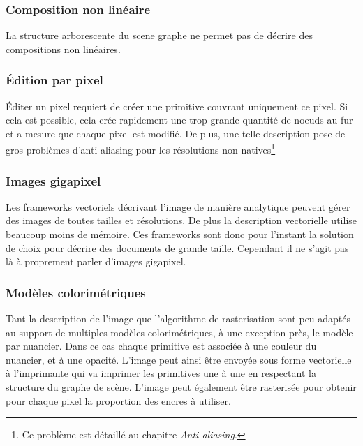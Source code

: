 			\subsubsection{Composition non linéaire}
				La structure arborescente du scene graphe ne permet pas de décrire des compositions non linéaires.
			\subsubsection{Édition par pixel}
				Éditer un pixel requiert de créer une primitive couvrant uniquement ce pixel. Si cela est possible, cela crée rapidement une trop
				grande quantité de noeuds au fur et a mesure que chaque pixel est modifié. De plus, une telle description pose de gros problèmes
				d'anti-aliasing pour les résolutions non natives\footnote{Ce problème est détaillé au chapitre \emph{Anti-aliasing}.} 
			\subsubsection{Images gigapixel}
				Les frameworks vectoriels décrivant l'image de manière analytique peuvent gérer des images de toutes tailles et résolutions. De 
				plus la description vectorielle utilise beaucoup moins de mémoire. Ces frameworks sont donc pour l'instant la solution de choix
				pour décrire des documents de grande taille. Cependant il ne s'agit pas là à proprement parler d'images gigapixel.  
			\subsubsection{Modèles colorimétriques}
				Tant la description de l'image que l'algorithme de rasterisation sont peu adaptés au support de multiples modèles 
				colorimétriques, à une exception près, le modèle par nuancier. Dans ce cas chaque primitive est associée à une couleur du nuancier,
				et à une opacité. L'image peut ainsi être envoyée sous forme vectorielle à l'imprimante qui va imprimer les primitives une à une
				en respectant la structure du graphe de scène. L'image peut également être rasterisée pour obtenir pour chaque pixel la proportion
				des encres à utiliser. 
